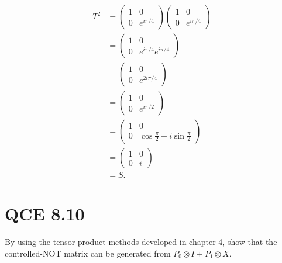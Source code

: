 \documentclass[10pt]{article}
\begin{document}
\begin{align*}
T^2 &= 
\begin{pmatrix}
1 &  0 \\
0  & e^{i\pi / 4}
\end{pmatrix}
\begin{pmatrix}
1 &  0 \\
0  & e^{i\pi / 4}
\end{pmatrix} \\
&=
\begin{pmatrix}
1 & 0 \\
0 & e^{i\pi / 4} e^{i\pi / 4}
\end{pmatrix} \\
&=
\begin{pmatrix}
1 & 0 \\
0 & e^{2i\pi / 4}
\end{pmatrix} \\
&=
\begin{pmatrix}
1 & 0 \\
0 & e^{i\pi / 2}
\end{pmatrix} \\
&=
\begin{pmatrix}
1 & 0 \\
0 & \cos \frac{\pi}{2} + i \sin \frac{\pi}{2}
\end{pmatrix} \\
&=
\begin{pmatrix}
1 & 0 \\
0 & i
\end{pmatrix} \\
&= S.
\end{align*}

\section*{QCE 8.10}
By using the tensor product methods developed in chapter 4, show that the controlled-NOT matrix can be generated from $P_0 \otimes I + P_1 \otimes X$.
\end{document}
